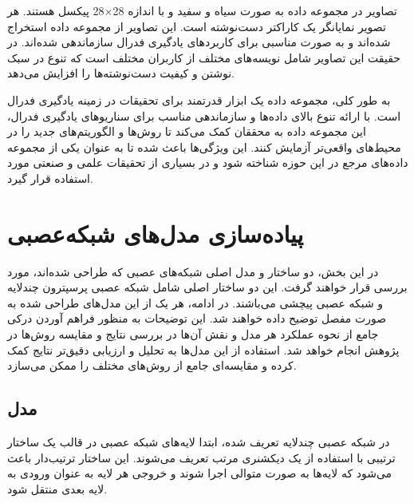 تصاویر در مجموعه داده
به صورت سیاه و سفید و با اندازه
28$\times$28
پیکسل هستند. هر تصویر نمایانگر یک کاراکتر دست‌نوشته است. این تصاویر از مجموعه داده
استخراج شده‌اند و به صورت مناسبی برای کاربردهای یادگیری فدرال سازماندهی شده‌اند. در حقیقت این تصاویر شامل نویسه‌های مختلف از کاربران مختلف است که تنوع در سبک نوشتن و کیفیت دست‌نوشته‌ها را افزایش می‌دهد.


به طور کلی، مجموعه داده
یک ابزار قدرتمند برای تحقیقات در زمینه یادگیری فدرال است. با ارائه تنوع بالای داده‌ها و سازماندهی مناسب برای سناریوهای یادگیری فدرال، این مجموعه داده به محققان کمک می‌کند تا روش‌ها و الگوریتم‌های جدید را در محیط‌های واقعی‌تر آزمایش کنند. این ویژگی‌ها باعث شده تا
به عنوان یکی از مجموعه داده‌های مرجع در این حوزه شناخته شود و در بسیاری از تحقیقات علمی و صنعتی مورد استفاده قرار گیرد.



\section{پیاده‌سازی مدل‌های شبکه‌عصبی}
در این بخش، دو ساختار و مدل اصلی شبکه‌های عصبی که طراحی شده‌اند، مورد بررسی قرار خواهند گرفت. این دو ساختار اصلی شامل شبکه عصبی پرسپترون چندلایه
%
و شبکه عصبی پیچشی
%
می‌باشند. در ادامه، هر یک از این مدل‌های طراحی شده به صورت مفصل توضیح داده خواهند شد. این توضیحات به منظور فراهم آوردن درکی جامع از نحوه عملکرد هر مدل و نقش آن‌ها در بررسی نتایج و مقایسه روش‌ها در پژوهش انجام خواهد شد. استفاده از این مدل‌ها به تحلیل و ارزیابی دقیق‌تر نتایج کمک کرده و مقایسه‌ای جامع از روش‌های مختلف را ممکن می‌سازد.

\subsection{
مدل
}
در شبکه عصبی چندلایه تعریف شده، ابتدا لایه‌های شبکه عصبی در قالب یک ساختار ترتیبی%
با استفاده از یک دیکشنری مرتب%
تعریف می‌شوند. این ساختار ترتیب‌دار باعث می‌شود که لایه‌ها به صورت متوالی اجرا شوند و خروجی هر لایه به عنوان ورودی به لایه بعدی منتقل شود.

